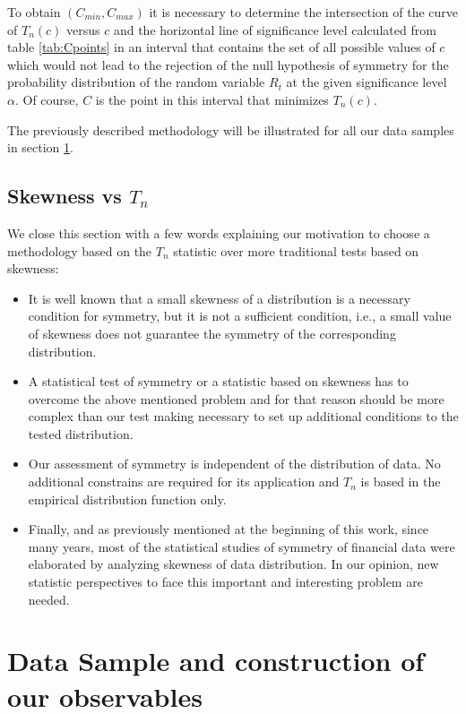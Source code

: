 \documentclass{elsarticle}
\begin{document}
To obtain $(C_{min},C_{max})$ it is necessary to determine the intersection of the curve of $T_{n}(c)$ versus $c$ and the horizontal line of significance level calculated from  table \ref{tab:Cpoints} in an interval that contains the set of all possible values of $c$ which would not lead to the rejection of the null hypothesis of symmetry for the probability distribution of the random variable $R_{t}$ at the given significance level $\alpha$. Of course, $C$ is the point in this interval that minimizes $T_{n}(c)$.

The previously  described methodology will be illustrated for all our data samples in section \ref{sec:Data}.

\subsection{Skewness vs $T_n$}

We close this section with a few words explaining our motivation to choose a methodology based on the $T_n$ statistic over  more traditional tests based on skewness:
\begin{itemize}
\item It is well known that a small skewness of a distribution is a necessary condition for symmetry, but it is not a sufficient condition, i.e., a small value of skewness does not guarantee the symmetry of the corresponding distribution.
\item A statistical test of symmetry or a statistic based on skewness has to overcome the above mentioned problem and for that reason should be more complex than our test making necessary to set up additional conditions to the tested distribution.
\item Our assessment of symmetry is independent of the distribution of data. No additional constrains are required for its application and $T_n$ is based in the empirical distribution function only.
\item Finally, and as previously mentioned at the beginning of this work, since many years, most of the statistical studies of symmetry of financial data were elaborated by analyzing skewness of data distribution. In our opinion, new statistic perspectives to face this important and interesting problem are needed.
\end{itemize}

\section{Data Sample and construction of our observables}
\label{sec:Data}
\end{document}

